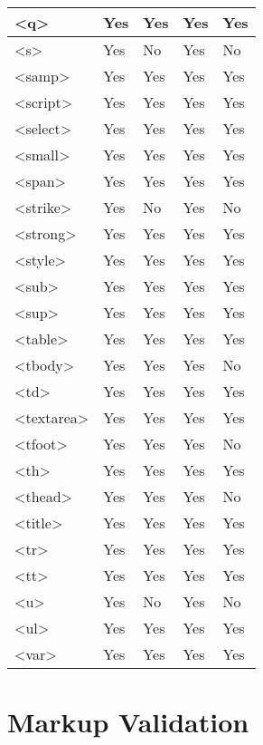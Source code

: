 \begin{longtable}{|p{70pt}|p{70pt}|p{70pt}|p{70pt}|p{70pt}|}
\hline
<q>					&Yes			&Yes	&Yes				&Yes	\\
\hline
<s>					&Yes			&No		&Yes				&No		\\
\hline
<samp>				&Yes			&Yes	&Yes				&Yes	\\
\hline
<script>				&Yes			&Yes	&Yes				&Yes	\\
\hline
<select>				&Yes			&Yes	&Yes				&Yes	\\
\hline
<small>				&Yes			&Yes	&Yes				&Yes	\\
\hline
<span>				&Yes			&Yes	&Yes				&Yes	\\
\hline
<strike>				&Yes			&No		&Yes				&No		\\
\hline
<strong>				&Yes			&Yes	&Yes				&Yes	\\
\hline
<style>				&Yes			&Yes	&Yes				&Yes	\\
\hline
<sub>				&Yes			&Yes	&Yes				&Yes	\\
\hline
<sup>				&Yes			&Yes	&Yes				&Yes	\\
\hline
<table>				&Yes			&Yes	&Yes				&Yes	\\
\hline
<tbody>				&Yes			&Yes	&Yes				&No		\\
\hline
<td>					&Yes			&Yes	&Yes				&Yes	\\
\hline
<textarea>			&Yes			&Yes	&Yes				&Yes	\\
\hline
<tfoot>				&Yes			&Yes	&Yes				&No		\\
\hline
<th>					&Yes			&Yes	&Yes				&Yes	\\
\hline
<thead>				&Yes			&Yes	&Yes				&No		\\
\hline
<title>				&Yes			&Yes	&Yes				&Yes	\\
\hline
<tr>					&Yes			&Yes	&Yes				&Yes	\\
\hline
<tt>					&Yes			&Yes	&Yes				&Yes	\\
\hline
<u>					&Yes			&No		&Yes				&No		\\
\hline
<ul>					&Yes			&Yes	&Yes				&Yes	\\
\hline
<var>				&Yes			&Yes	&Yes				&Yes	\\
\hline
\end{longtable}

\section{Markup Validation}

